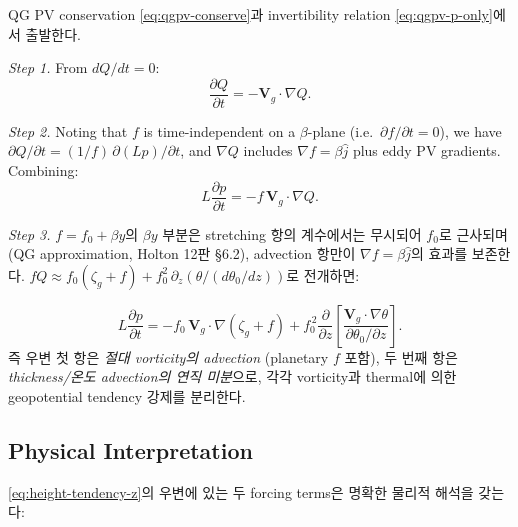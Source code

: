 QG PV conservation \eqref{eq:qgpv-conserve}과
invertibility relation \eqref{eq:qgpv-p-only}에서 출발한다.

\textit{Step 1.}  From $dQ/dt = 0$:
\begin{equation}\label{eq:ht-step1}
  \frac{\partial Q}{\partial t} = -\mathbf{V}_g\cdot\nabla Q.
\end{equation}

\textit{Step 2.}  Noting that $f$ is time-independent on a $\beta$-plane
(i.e.\ $\partial f/\partial t = 0$), we have
$\partial Q/\partial t = (1/f)\,\partial(Lp)/\partial t$,
and $\nabla Q$ includes $\nabla f = \beta\hat{j}$ plus eddy PV gradients.
Combining:
\begin{equation}\label{eq:ht-step2}
  L\frac{\partial p}{\partial t} = -f\,\mathbf{V}_g\cdot\nabla Q.
\end{equation}

\textit{Step 3.}  $f = f_0 + \beta y$의 $\beta y$ 부분은 stretching 항의 계수에서는
무시되어 $f_0$로 근사되며 (QG approximation, Holton 12판 §6.2), advection 항만이
$\nabla f = \beta\hat j$의 효과를 보존한다.  $fQ \approx f_0(\zeta_g + f)
+ f_0^2\,\partial_z(\theta/(d\theta_0/dz))$로 전개하면:

\begin{equation}\label{eq:height-tendency-z}
  \boxed{
  L\frac{\partial p}{\partial t}
  = -f_0\,\mathbf{V}_g\cdot\nabla(\zeta_g + f)
    + f_0^{\,2}\frac{\partial}{\partial z}
      \!\left[\frac{\mathbf{V}_g\cdot\nabla\theta}
              {\partial\theta_0/\partial z}\right].
  }
\end{equation}
즉 우변 첫 항은 \emph{절대 vorticity의 advection} (planetary $f$ 포함), 두 번째 항은
\emph{thickness/온도 advection의 연직 미분}으로, 각각 vorticity과 thermal에 의한
geopotential tendency 강제를 분리한다.

\subsection{Physical Interpretation}\label{subsec:height-tendency-phys}

\eqref{eq:height-tendency-z}의 우변에 있는 두 forcing terms은
명확한 물리적 해석을 갖는다:

